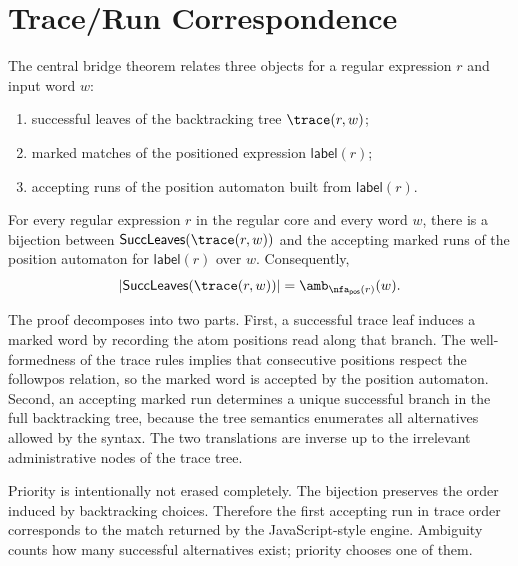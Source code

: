 \section{Trace/Run Correspondence}

The central bridge theorem relates three objects for a regular expression \(r\)
and input word \(w\):
\begin{enumerate}
\item successful leaves of the backtracking tree \(\trace(r,w)\);
\item marked matches of the positioned expression \(\mathsf{label}(r)\);
\item accepting runs of the position automaton built from \(\mathsf{label}(r)\).
\end{enumerate}

\begin{theorem}
\label{thm:trace-run}
For every regular expression \(r\) in the regular core and every word \(w\),
there is a bijection between \(\mathsf{SuccLeaves}(\trace(r,w))\) and the
accepting marked runs of the position automaton for \(\mathsf{label}(r)\) over
\(w\).  Consequently,
\[
  |\mathsf{SuccLeaves}(\trace(r,w))|
  =
  \amb_{\nfa_{\mathsf{pos}}(r)}(w).
\]
\end{theorem}

The proof decomposes into two parts.  First, a successful trace leaf induces a
marked word by recording the atom positions read along that branch.  The
well-formedness of the trace rules implies that consecutive positions respect
the followpos relation, so the marked word is accepted by the position
automaton.  Second, an accepting marked run determines a unique successful
branch in the full backtracking tree, because the tree semantics enumerates all
alternatives allowed by the syntax.  The two translations are inverse up to the
irrelevant administrative nodes of the trace tree.

Priority is intentionally not erased completely.  The bijection preserves the
order induced by backtracking choices.  Therefore the first accepting run in
trace order corresponds to the match returned by the JavaScript-style engine.
Ambiguity counts how many successful alternatives exist; priority chooses one of
them.

